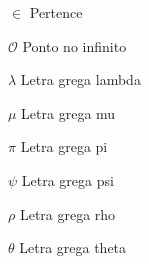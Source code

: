 \begin{simbolos}
  \item[$ \in $] Pertence
  \item[$ \mathcal{O} $] Ponto no infinito
  \item[$ \lambda $] Letra grega lambda
  \item[$ \mu $] Letra grega mu
  \item[$ \pi $] Letra grega pi
  \item[$ \psi $] Letra grega psi
  \item[$ \rho $] Letra grega rho
  \item[$ \theta $] Letra grega theta
\end{simbolos}

